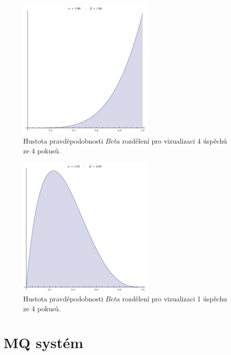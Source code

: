 \documentclass[thesis=M,czech]{FITthesis}[2014/05/07]
\begin{document}
\begin{figure}\centering
	\includegraphics[width=0.6\textwidth]{obr/beta1.png}
 	\caption[Hustota pravděpodobnosti $Beta$ rozdělení pro vizualizaci 4 úspěchů ze 4 pokusů.]{Hustota pravděpodobnosti $Beta$ rozdělení pro vizualizaci 4 úspěchů ze 4 pokusů.}\label{fig:beta1}
\end{figure}	

\begin{figure}\centering
	\includegraphics[width=0.6\textwidth]{obr/beta2.png}
 	\caption[Hustota pravděpodobnosti $Beta$ rozdělení pro vizualizaci 1 úspěchu ze 4 pokusů.]{Hustota pravděpodobnosti $Beta$ rozdělení pro vizualizaci 1 úspěchu ze 4 pokusů.}\label{fig:beta2}
\end{figure}	

\section{MQ systém}
\end{document}
